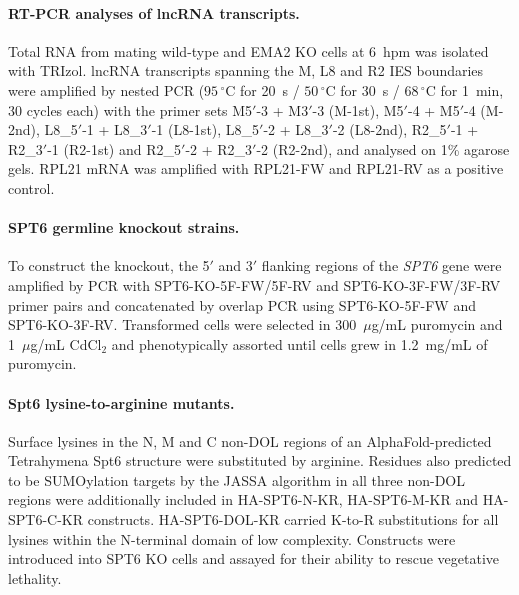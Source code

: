 \documentclass[11pt]{article}
\begin{document}
\paragraph{RT-PCR analyses of lncRNA transcripts.}
Total RNA from mating wild-type and EMA2 KO cells at 6~hpm was isolated
with TRIzol. lncRNA transcripts spanning the M, L8 and R2 IES boundaries
were amplified by nested PCR ($95\,^{\circ}$C for 20~s / $50\,^{\circ}$C
for 30~s / $68\,^{\circ}$C for 1~min, 30 cycles each) with the primer sets
M5$'$-3 + M3$'$-3 (M-1st), M5$'$-4 + M5$'$-4 (M-2nd), L8\_5$'$-1 + L8\_3$'$-1
(L8-1st), L8\_5$'$-2 + L8\_3$'$-2 (L8-2nd), R2\_5$'$-1 + R2\_3$'$-1 (R2-1st)
and R2\_5$'$-2 + R2\_3$'$-2 (R2-2nd), and analysed on 1\% agarose gels.
RPL21 mRNA was amplified with RPL21-FW and RPL21-RV as a positive control.

\paragraph{SPT6 germline knockout strains.}
To construct the knockout, the 5$'$ and 3$'$ flanking regions of the
\emph{SPT6} gene were amplified by PCR with SPT6-KO-5F-FW/5F-RV and
SPT6-KO-3F-FW/3F-RV primer pairs and concatenated by overlap PCR using
SPT6-KO-5F-FW and SPT6-KO-3F-RV. Transformed cells were selected in
300~$\mu$g/mL puromycin and 1~$\mu$g/mL CdCl$_2$ and phenotypically
assorted until cells grew in 1.2~mg/mL of puromycin.

\paragraph{Spt6 lysine-to-arginine mutants.}
Surface lysines in the N, M and C non-DOL regions of an AlphaFold-predicted
Tetrahymena Spt6 structure were substituted by arginine. Residues also
predicted to be SUMOylation targets by the JASSA algorithm in all three
non-DOL regions were additionally included in HA-SPT6-N-KR, HA-SPT6-M-KR
and HA-SPT6-C-KR constructs. HA-SPT6-DOL-KR carried K-to-R substitutions
for all lysines within the N-terminal domain of low complexity. Constructs
were introduced into SPT6 KO cells and assayed for their ability to rescue
vegetative lethality.



\end{document}
